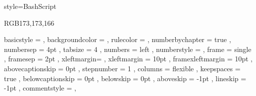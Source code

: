 {
    style=BashScript
}

\definecolor{sublimegray} {RGB}{173,173,166}

{
    basicstyle       = 
    \ttfamily\color{sublimewhite}
    \lst@ifdisplaystyle\scriptsize\fi %
,   backgroundcolor  = \color{sublimeblack}
,   rulecolor        = \color{black}
,   numberbychapter  = true
,   numbersep        = 4pt
,   tabsize          =  4          
,   numbers          = left
,   numberstyle      = \tiny\color{sublimewhite}\noncopynumber
,   frame            = single
,   framesep         =  2pt
,   xleftmargin=\parindent
,   xleftmargin      = 10pt
,   framexleftmargin = 10pt
,   abovecaptionskip = 0pt
,   stepnumber       = 1
,   columns          = flexible
,   keepspaces       = true
,   belowcaptionskip = 0pt
,   belowskip        = 0pt
,   aboveskip        = -1pt
,   lineskip         = -1pt
,   commentstyle     = \color{sublimegray},
}
